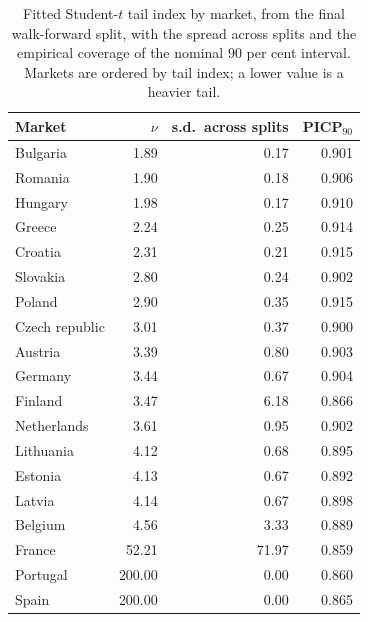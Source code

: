 \begin{table}[htbp]
\centering
\small
\caption{Fitted Student-$t$ tail index by market, from the final walk-forward split, with the spread across splits and the empirical coverage of the nominal 90 per cent interval. Markets are ordered by tail index; a lower value is a heavier tail.}
\label{tab:nu-by-channel}
\begin{tabular}{@{}lrrr@{}}
\toprule
Market & $\nu$ & s.d.\ across splits & PICP$_{90}$ \\
\midrule
Bulgaria & 1.89 & 0.17 & 0.901 \\
Romania & 1.90 & 0.18 & 0.906 \\
Hungary & 1.98 & 0.17 & 0.910 \\
Greece & 2.24 & 0.25 & 0.914 \\
Croatia & 2.31 & 0.21 & 0.915 \\
Slovakia & 2.80 & 0.24 & 0.902 \\
Poland & 2.90 & 0.35 & 0.915 \\
Czech republic & 3.01 & 0.37 & 0.900 \\
Austria & 3.39 & 0.80 & 0.903 \\
Germany & 3.44 & 0.67 & 0.904 \\
Finland & 3.47 & 6.18 & 0.866 \\
Netherlands & 3.61 & 0.95 & 0.902 \\
Lithuania & 4.12 & 0.68 & 0.895 \\
Estonia & 4.13 & 0.67 & 0.892 \\
Latvia & 4.14 & 0.67 & 0.898 \\
Belgium & 4.56 & 3.33 & 0.889 \\
France & 52.21 & 71.97 & 0.859 \\
Portugal & 200.00 & 0.00 & 0.860 \\
Spain & 200.00 & 0.00 & 0.865 \\
\bottomrule
\end{tabular}
\end{table}
